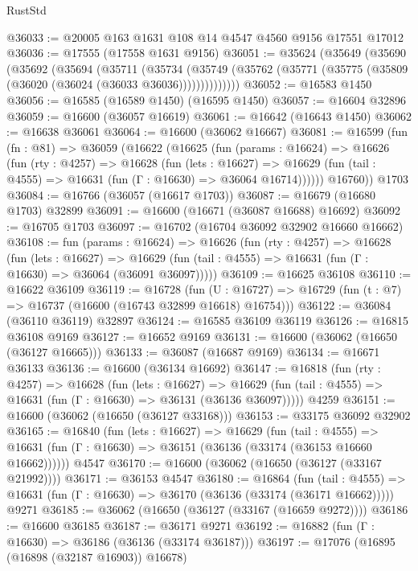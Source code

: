 \begin{lexlean}{RustStd}
\begin{coremodule}
@36033 := @20005 @163 @1631 @108 @14 @4547 @4560 @9156 @17551 @17012
@36036 := @17555 (@17558 @1631 @9156)
@36051 := @35624
    (@35649
      (@35690
        (@35692
          (@35694
            (@35711
              (@35734
                (@35749 (@35762 (@35771 (@35775 (@35809 (@36020 (@36024 (@36033 @36036))))))))))))))
@36052 := @16583 @1450
@36056 := @16585 (@16589 @1450) (@16595 @1450)
@36057 := @16604 @32896
@36059 := @16600 (@36057 @16619)
@36061 := @16642 (@16643 @1450)
@36062 := @16638 @36061
@36064 := @16600 (@36062 @16667)
@36081 := @16599
    (fun (fn : @81) =>
    @36059
      (@16622
        (@16625
          (fun (params : @16624) =>
          @16626
            (fun (rty : @4257) =>
            @16628
              (fun (lets : @16627) =>
              @16629 (fun (tail : @4555) => @16631 (fun (Γ : @16630) => @36064 @16714))))))
        @16760))
    @1703
@36084 := @16766 (@36057 (@16617 @1703))
@36087 := @16679 (@16680 @1703) @32899
@36091 := @16600 (@16671 (@36087 @16688) @16692)
@36092 := @16705 @1703
@36097 := @16702 (@16704 @36092 @32902 @16660 @16662)
@36108 := fun (params : @16624) =>
  @16626
    (fun (rty : @4257) =>
    @16628
      (fun (lets : @16627) =>
      @16629 (fun (tail : @4555) => @16631 (fun (Γ : @16630) => @36064 (@36091 @36097)))))
@36109 := @16625 @36108
@36110 := @16622 @36109
@36119 := @16728
    (fun (U : @16727) => @16729 (fun (t : @7) => @16737 (@16600 (@16743 @32899 @16618) @16754)))
@36122 := @36084 (@36110 @36119) @32897
@36124 := @16585 @36109 @36119
@36126 := @16815 @36108 @9169
@36127 := @16652 @9169
@36131 := @16600 (@36062 (@16650 (@36127 @16665)))
@36133 := @36087 (@16687 @9169)
@36134 := @16671 @36133
@36136 := @16600 (@36134 @16692)
@36147 := @16818
    (fun (rty : @4257) =>
    @16628
      (fun (lets : @16627) =>
      @16629 (fun (tail : @4555) => @16631 (fun (Γ : @16630) => @36131 (@36136 @36097)))))
    @4259
@36151 := @16600 (@36062 (@16650 (@36127 @33168)))
@36153 := @33175 @36092 @32902
@36165 := @16840
    (fun (lets : @16627) =>
    @16629
      (fun (tail : @4555) =>
      @16631 (fun (Γ : @16630) => @36151 (@36136 (@33174 (@36153 @16660 @16662))))))
    @4547
@36170 := @16600 (@36062 (@16650 (@36127 (@33167 @21992))))
@36171 := @36153 @4547
@36180 := @16864
    (fun (tail : @4555) => @16631 (fun (Γ : @16630) => @36170 (@36136 (@33174 (@36171 @16662)))))
    @9271
@36185 := @36062 (@16650 (@36127 (@33167 (@16659 @9272))))
@36186 := @16600 @36185
@36187 := @36171 @9271
@36192 := @16882 (fun (Γ : @16630) => @36186 (@36136 (@33174 @36187)))
@36197 := @17076 (@16895 (@16898 (@32187 @16903)) @16678)

\end{coremodule}
\end{lexlean}

